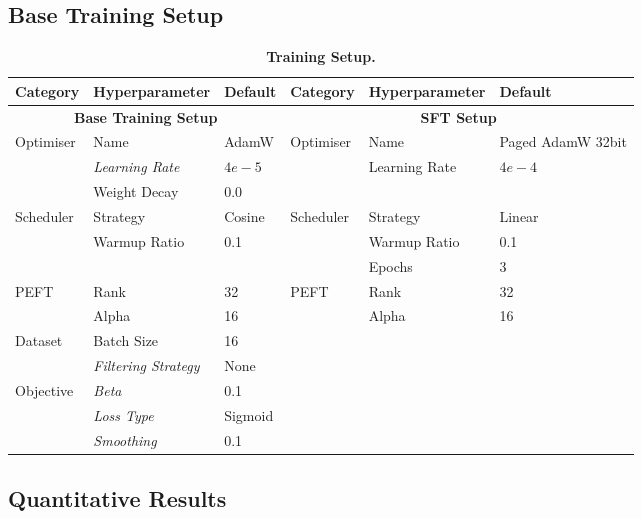 \subsection{Base Training Setup}
\label{subsec:base-training-setup}

\begin{table*}[H]
    \centering
    \small
    \caption{\textbf{Training Setup.}}
    \label{tab:hyperparameter-comparison}
    \begin{tabular}{llp{3cm}llp{3cm}}
        \toprule
        \textbf{Category} & \textbf{Hyperparameter} & \textbf{Default} & \textbf{Category} & \textbf{Hyperparameter} & \textbf{Default} \\
        \midrule
        \multicolumn{3}{c}{\textbf{Base Training Setup}} & \multicolumn{3}{c}{\textbf{SFT Setup}} \\
        \midrule
        Optimiser & Name & AdamW & Optimiser & Name & Paged AdamW 32bit \\
         & \textit{Learning Rate} & $4e-5$ & & Learning Rate & $4e-4$ \\
         & Weight Decay & 0.0 & & & \\
        \midrule
        Scheduler & Strategy & Cosine & Scheduler & Strategy & Linear \\
         & Warmup Ratio & 0.1 & & Warmup Ratio & 0.1 \\
         & & & & Epochs & 3 \\
        \midrule
        PEFT & Rank & 32 & PEFT & Rank & 32 \\
         & Alpha & 16 & & Alpha & 16 \\
        \midrule
        Dataset & Batch Size & 16 & & & \\
         & \textit{Filtering Strategy} & None & & & \\
        \midrule
        Objective & \textit{Beta} & 0.1 & & & \\
         & \textit{Loss Type} & Sigmoid & & & \\
         & \textit{Smoothing} & 0.1 & & & \\
        \bottomrule
    \end{tabular}
\end{table*}

\subsection{Quantitative Results}
\label{subsec:quantitative-results}



